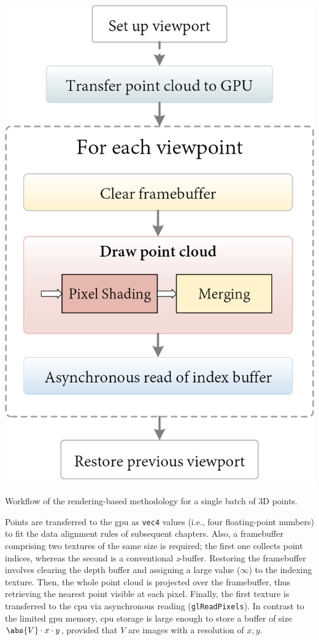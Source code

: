 \begin{marginfigure}[.2cm]
    \centering
    \includegraphics[width=\linewidth]{figs/multi_thermal_projection/occlusion_opengl.png}
    \caption{Workflow of the rendering-based methodology for a single batch of 3D points.}
    \label{fig:occlusion_opengl_zbuffer}
\end{marginfigure}
Points are transferred to the \acrshort{gpu} as \verb|vec4| values (i.e., four floating-point numbers) to fit the data alignment rules of subsequent chapters. Also, a framebuffer comprising two textures of the same size is required; the first one collects point indices, whereas the second is a conventional \textit{z}-buffer. Restoring the framebuffer involves clearing the depth buffer and assigning a large value ($\infty$) to the indexing texture. Then, the whole point cloud is projected over the framebuffer, thus retrieving the nearest point visible at each pixel. Finally, the first texture is transferred to the \acrshort{cpu} via asynchronous reading (\verb|glReadPixels|). In contrast to the limited \acrshort{gpu} memory, \acrshort{cpu} storage is large enough to store a buffer of size $\abs{V} \cdot x \cdot y$, provided that $V$ are images with a resolution of $x, y$.

